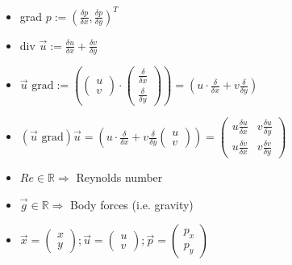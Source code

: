 \documentclass[a4paper,11pt]{scrartcl}
\begin{document}
\begin{itemize}
	\item grad $p := (\frac{\delta p}{\delta x},\frac{\delta p}{\delta y})^T$
	\item div $\vec{u} := \frac{\delta u}{\delta x} + \frac{\delta v}{\delta y}$
	\item $\vec{u} \text{ grad} := \left( \begin{pmatrix}
		u \\
		v
	\end{pmatrix}
	\cdot \begin{pmatrix}
		\frac{\delta}{\delta x} \\
		\frac{\delta}{\delta y}
	\end{pmatrix}\right)
	= (u \cdot \frac{\delta}{\delta x} + v \frac{\delta}{\delta y})$
	\item $(\vec{u} \text{ grad} ) \vec{u} = \left( u \cdot \frac{\delta}{\delta x} + v \frac{\delta}{\delta y}\begin{pmatrix}
		u \\
		v
	\end{pmatrix}\right) = \begin{pmatrix}
		u \frac{\delta u}{\delta x} & v \frac{\delta u}{\delta y}\\
		u \frac{\delta v}{\delta x} & v \frac{\delta v}{\delta y}
	\end{pmatrix}$
	\item $Re \in \mathds{R} \Rightarrow$ Reynolds number
	\item $\vec{g} \in \mathds{R} \Rightarrow$ Body forces (i.e. gravity)
	\item $\vec{x} = \begin{pmatrix}
	x\\
	y
	\end{pmatrix}; \vec{u} = \begin{pmatrix}
	u\\
	v
	\end{pmatrix}; \vec{p} = \begin{pmatrix}
	p_x \\
	p_y
	\end{pmatrix}$
\end{itemize}
\end{document}
